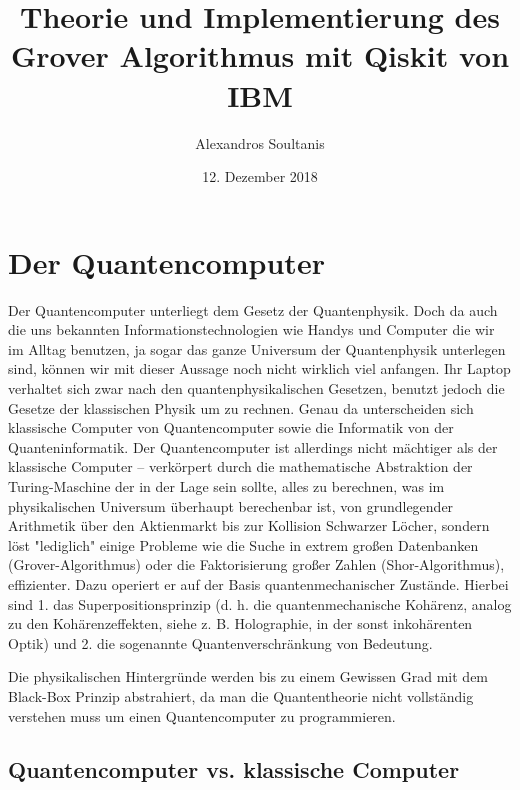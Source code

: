 \documentclass[a4paper,10pt]{scrartcl}
\title{Theorie und Implementierung des Grover Algorithmus mit Qiskit von IBM}
\author{Alexandros Soultanis}
\date{12. Dezember 2018}
\begin{document}
\maketitle
\tableofcontents

\section{Der Quantencomputer}

Der Quantencomputer unterliegt dem Gesetz der Quantenphysik. Doch da auch die uns bekannten Informationstechnologien wie Handys und Computer die wir im Alltag benutzen, ja sogar das ganze Universum der Quantenphysik unterlegen sind, können wir mit dieser Aussage noch nicht wirklich viel anfangen. Ihr Laptop verhaltet sich zwar nach den quantenphysikalischen Gesetzen, benutzt jedoch die Gesetze der klassischen Physik um zu rechnen. Genau da unterscheiden sich klassische Computer von Quantencomputer sowie die Informatik von der Quanteninformatik. Der Quantencomputer ist allerdings nicht mächtiger als der klassische Computer – verkörpert durch die mathematische Abstraktion der Turing-Maschine der in der Lage sein sollte, alles zu berechnen, was im physikalischen Universum überhaupt berechenbar ist, von grundlegender Arithmetik über den Aktienmarkt bis zur Kollision Schwarzer Löcher, sondern löst "lediglich" einige Probleme wie die Suche in extrem großen Datenbanken (Grover-Algorithmus) oder die Faktorisierung großer Zahlen (Shor-Algorithmus), effizienter.
Dazu operiert er auf der Basis quantenmechanischer Zustände. Hierbei sind
1. das Superpositionsprinzip (d. h. die quantenmechanische Kohärenz, analog zu den Kohärenzeffekten, siehe z. B. Holographie, in der sonst inkohärenten Optik) und
2. die sogenannte Quantenverschränkung
von Bedeutung.

Die physikalischen Hintergründe werden bis zu einem Gewissen Grad mit dem Black-Box Prinzip abstrahiert, da man die Quantentheorie nicht vollständig verstehen muss um einen Quantencomputer zu programmieren.

\subsection{Quantencomputer vs. klassische Computer}
\end{document}
